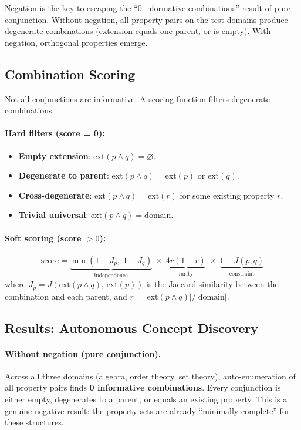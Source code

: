 Negation is the key to escaping the ``0 informative combinations'' result of pure conjunction. Without negation, all property pairs on the test domains produce degenerate combinations (extension equals one parent, or is empty). With negation, orthogonal properties emerge.

\subsection{Combination Scoring}

Not all conjunctions are informative. A scoring function filters degenerate combinations:

\paragraph{Hard filters (score = 0):}
\begin{itemize}
\item \textbf{Empty extension}: $\mathrm{ext}(p \wedge q) = \varnothing$.
\item \textbf{Degenerate to parent}: $\mathrm{ext}(p \wedge q) = \mathrm{ext}(p)$ or $\mathrm{ext}(q)$.
\item \textbf{Cross-degenerate}: $\mathrm{ext}(p \wedge q) = \mathrm{ext}(r)$ for some existing property $r$.
\item \textbf{Trivial universal}: $\mathrm{ext}(p \wedge q) = \mathrm{domain}$.
\end{itemize}

\paragraph{Soft scoring (score $> 0$):}
\[
\text{score} = \underbrace{\min(1 - J_p,\; 1 - J_q)}_{\text{independence}} \;\times\; \underbrace{4r(1-r)}_{\text{rarity}} \;\times\; \underbrace{1 - J(p, q)}_{\text{constraint}}
\]
where $J_p = J(\mathrm{ext}(p \wedge q),\, \mathrm{ext}(p))$ is the Jaccard similarity between the combination and each parent, and $r = |\mathrm{ext}(p \wedge q)| / |\mathrm{domain}|$.

\subsection{Results: Autonomous Concept Discovery}

\paragraph{Without negation (pure conjunction).} Across all three domains (algebra, order theory, set theory), auto-enumeration of all property pairs finds \textbf{0 informative combinations}. Every conjunction is either empty, degenerates to a parent, or equals an existing property. This is a genuine negative result: the property sets are already ``minimally complete'' for these structures.


